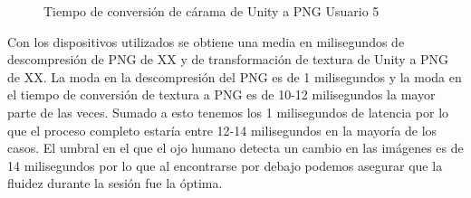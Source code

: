 \begin{enumerate}
\begin{figure}[!h]
\centering
{}%
\caption{Tiempo de conversi\'on de c\'arama de Unity a PNG Usuario 5}
\end{figure}

Con los dispositivos utilizados se obtiene una media en milisegundos de descompresi\'on de PNG de XX y de transformaci\'on de textura de Unity a PNG de XX. La moda en la descompresi\'on del PNG es de 1 milisegundos y la moda en el tiempo de conversi\'on de textura a PNG es de 10-12 milisegundos la mayor parte de las veces. Sumado a esto tenemos los 1 milisegundos de latencia por lo que el proceso completo estar\'ia entre 12-14 milisegundos en la mayor\'ia de los casos. El umbral en el que el ojo humano detecta un cambio en las im\'agenes es de 14 milisegundos por lo que al encontrarse por debajo podemos asegurar que la fluidez durante la sesi\'on fue la \'optima.


\end{enumerate}



